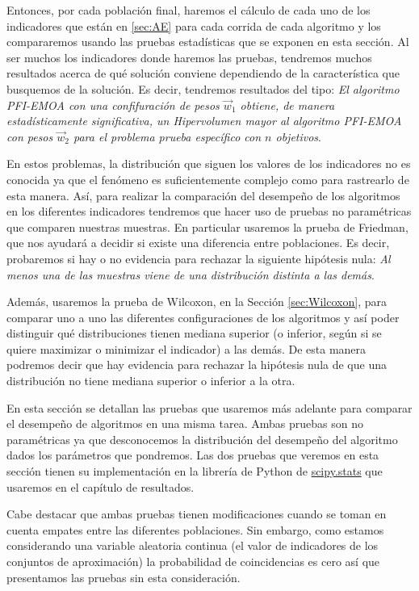 Entonces, por cada población final, haremos el cálculo de cada uno de los indicadores que están en \ref{sec:AE} para cada corrida de cada algoritmo y los compararemos usando las pruebas estadísticas que se exponen en esta sección. Al ser muchos los indicadores donde haremos las pruebas, tendremos muchos resultados acerca de qué solución conviene dependiendo de la característica que busquemos de la solución. Es decir, tendremos resultados del tipo: \emph{El algoritmo PFI-EMOA con una confifuración de pesos $\vec{w}_1$ obtiene, de manera estadísticamente significativa, un Hipervolumen mayor al algoritmo PFI-EMOA con pesos $\vec{w}_2$ para el problema  prueba específico con $n$ objetivos}.   

En estos problemas, la distribución que siguen los valores de los indicadores no es conocida ya que el fenómeno es suficientemente complejo como para rastrearlo de esta manera. Así, para realizar la comparación del desempeño de los algoritmos en los diferentes indicadores tendremos que hacer uso de pruebas no paramétricas que comparen nuestras muestras. En particular usaremos la prueba de Friedman, que nos ayudará a decidir si existe una diferencia entre poblaciones. Es decir, probaremos si hay o no evidencia para rechazar la siguiente hipótesis nula: \emph{Al menos una de las muestras viene de una distribución distinta a las demás}. 

Además, usaremos la prueba de Wilcoxon, en la Sección \ref{sec:Wilcoxon}, para comparar uno a uno las diferentes configuraciones de los algoritmos y así poder distinguir qué distribuciones tienen mediana superior (o inferior, según si se quiere maximizar o minimizar el indicador) a las demás. De esta manera podremos decir que hay evidencia para rechazar la hipótesis nula de que una distribución no tiene mediana superior o inferior a la otra.

En esta sección se detallan las pruebas que usaremos más adelante para comparar el desempeño de algoritmos en una misma tarea. Ambas pruebas son no paramétricas ya que desconocemos la distribución del desempeño del algoritmo dados los parámetros que pondremos. Las dos pruebas que veremos en esta sección tienen su implementación en la librería de Python de  \href{https://docs.scipy.org/doc/scipy/reference/stats.html}{scipy.stats} que usaremos en el capítulo de resultados. 

Cabe destacar que ambas pruebas tienen modificaciones cuando se toman en cuenta empates entre las diferentes poblaciones. Sin embargo, como estamos considerando una variable aleatoria continua (el valor de indicadores de los conjuntos de aproximación) la probabilidad de coincidencias es cero así que presentamos las pruebas sin esta consideración.


